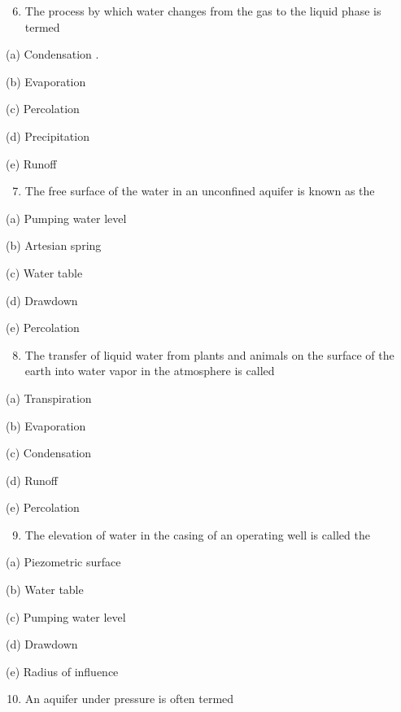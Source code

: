 \documentclass[10pt]{article}
\begin{document}
\begin{enumerate}
  \setcounter{enumi}{5}
  \item The process by which water changes from the gas to the liquid phase is termed
\end{enumerate}

(a) Condensation .

(b) Evaporation

(c) Percolation

(d) Precipitation

(e) Runoff

\begin{enumerate}
  \setcounter{enumi}{6}
  \item The free surface of the water in an unconfined aquifer is known as the
\end{enumerate}

(a) Pumping water level

(b) Artesian spring

(c) Water table

(d) Drawdown

(e) Percolation

\begin{enumerate}
  \setcounter{enumi}{7}
  \item The transfer of liquid water from plants and animals on the surface of the earth into water vapor in the atmosphere is called
\end{enumerate}

(a) Transpiration

(b) Evaporation

(c) Condensation

(d) Runoff

(e) Percolation

\begin{enumerate}
  \setcounter{enumi}{8}
  \item The elevation of water in the casing of an operating well is called the
\end{enumerate}

(a) Piezometric surface

(b) Water table

(c) Pumping water level

(d) Drawdown

(e) Radius of influence

\begin{enumerate}
  \setcounter{enumi}{9}
  \item An aquifer under pressure is often termed
\end{enumerate}
\end{document}
